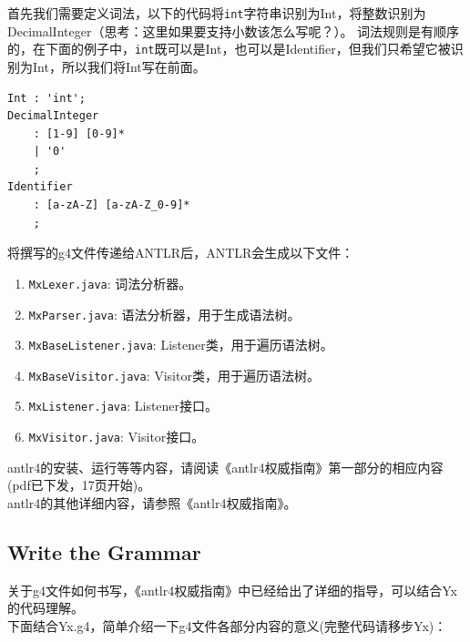 首先我们需要定义词法，以下的代码将\texttt{int}字符串识别为Int，将整数识别为DecimalInteger（思考：这里如果要支持小数该怎么写呢？）。
词法规则是有顺序的，在下面的例子中，\texttt{int}既可以是Int，也可以是Identifier，但我们只希望它被识别为Int，所以我们将Int写在前面。
\begin{lstlisting}
Int : 'int';
DecimalInteger
    : [1-9] [0-9]*
    | '0'
    ;
Identifier
    : [a-zA-Z] [a-zA-Z_0-9]*
    ;
\end{lstlisting}



将撰写的g4文件传递给ANTLR后，ANTLR会生成以下文件：
\begin{enumerate}
    \item \texttt{MxLexer.java}: 词法分析器。
    \item \texttt{MxParser.java}: 语法分析器，用于生成语法树。
    \item \texttt{MxBaseListener.java}: Listener类，用于遍历语法树。
    \item \texttt{MxBaseVisitor.java}: Visitor类，用于遍历语法树。
    \item \texttt{MxListener.java}: Listener接口。
    \item \texttt{MxVisitor.java}: Visitor接口。
\end{enumerate}


antlr4的安装、运行等等内容，请阅读《antlr4权威指南》第一部分的相应内容(pdf已下发，17页开始)。\\

antlr4的其他详细内容，请参照《antlr4权威指南》。

\subsection{Write the Grammar}
关于g4文件如何书写，《antlr4权威指南》中已经给出了详细的指导，可以结合Yx的代码理解。\\

下面结合Yx.g4，简单介绍一下g4文件各部分内容的意义(完整代码请移步Yx)：\\

